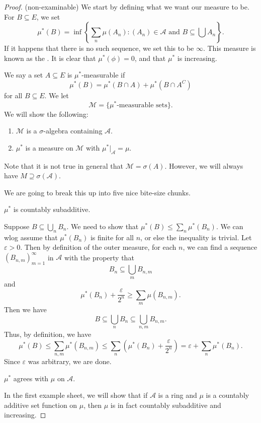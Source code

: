 \documentclass[a4paper]{article}
\begin{document}
\begin{proof}(non-examinable)
  We start by defining what we want our measure to be. For $B \subseteq E$, we set
  \[
    \mu^*(B) = \inf\left\{\sum_n\mu(A_n): (A_n) \in \mathcal{A}\text{ and } B\subseteq \bigcup A_n\right\}.
  \]
  If it happens that there is no such sequence, we set this to be $\infty$. This measure is known as the . It is clear that $\mu^*(\phi) = 0$, and that $\mu^*$ is increasing.

  We say a set $A \subseteq E$ is $\mu^*$-measurable if
  \[
    \mu^*(B) = \mu^*(B \cap A) + \mu^*(B \cap A^C)
  \]
  for all $B \subseteq E$. We let
  \[
    \mathcal{M} = \{\text{$\mu^*$-measurable sets}\}.
  \]
  We will show the following:
  \begin{enumerate}
    \item $\mathcal{M}$ is a $\sigma$-algebra containing $\mathcal{A}$.
    \item $\mu^*$ is a measure on $\mathcal{M}$ with $\mu^*|_{\mathcal{A}} = \mu$.
  \end{enumerate}
  Note that it is not true in general that $\mathcal{M} = \sigma(A)$. However, we will always have $M \supseteq \sigma(\mathcal{A})$.

  We are going to break this up into five nice bite-size chunks.

  \begin{claim}
    $\mu^*$ is countably subadditive.
  \end{claim}
  Suppose $B\subseteq \bigcup_n B_n$. We need to show that $\mu^*(B) \leq \sum_n \mu^*(B_n)$. We can wlog assume that $\mu^*(B_n)$ is finite for all $n$, or else the inequality is trivial. Let $\varepsilon > 0$. Then by definition of the outer measure, for each $n$, we can find a sequence $(B_{n, m})_{m = 1}^\infty$ in $\mathcal{A}$ with the property that
  \[
    B_n \subseteq \bigcup_m B_{n, m}
  \]
  and
  \[
    \mu^*(B_n) + \frac{\varepsilon}{2^n} \geq \sum_m \mu(B_{n, m}).
  \]
  Then we have
  \[
    B \subseteq \bigcup_n B_n \subseteq \bigcup_{n, m}B_{n, m}.
  \]
  Thus, by definition, we have
  \[
    \mu^*(B) \leq \sum_{n, m}\mu^*(B_{n, m}) \leq \sum_n \left(\mu^*(B_n) + \frac{\varepsilon}{2^n}\right) = \varepsilon + \sum_n \mu^*(B_n).
  \]
  Since $\varepsilon$ was arbitrary, we are done.
  \begin{claim}
    $\mu^*$ agrees with $\mu$ on $\mathcal{A}$.
  \end{claim}
  In the first example sheet, we will show that if $\mathcal{A}$ is a ring and $\mu$ is a countably additive set function on $\mu$, then $\mu$ is in fact countably subadditive and increasing.


\end{proof}
\end{document}

